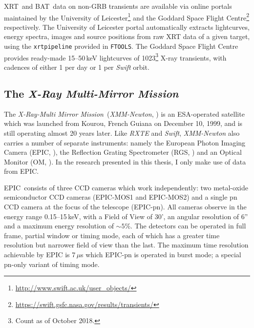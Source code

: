 \par XRT\indexxrt\ and BAT\indexbat\ data on non-GRB transients are available via online portals maintained by the University of Leicester\footnote{\url{http://www.swift.ac.uk/user_objects/}} and the Goddard Space Flight Centre\footnote{\url{https://swift.gsfc.nasa.gov/results/transients/}} respectively.  The University of Leicester portal automatically extracts lightcurves, energy spectra, images and source positions from raw XRT data of a given target, using the \texttt{xrtpipeline} provided in \texttt{FTOOLS}.  The Goddard Space Flight Centre provides ready-made 15--50\,keV lightcurves of 1023\footnote{Count as of October 2018.} X-ray transients, with cadences of either 1 per day or 1 per \textit{Swift} orbit.

\subsection{The \textit{X-Ray Multi-Mirror Mission}}

\par The \textit{X-Ray-Multi Mirror Mission}\indexxmm\ (\textit{XMM-Newton}, \citealp{Jansen_XMM}) is an ESA-operated satellite which was launched from Kourou, French Guiana on December 10, 1999, and is still operating almost 20 years later.  Like \textit{RXTE} and \textit{Swift}, \textit{XMM-Newton} also carries a number of separate instruments: namely the European Photon Imaging Camera (EPIC\indexepic, \citealp{Bignami_EPIC}), the Reflection Grating Spectrometer (RGS\indexrgs, \citealp{denHerder_RGS}) and an Optical Monitor (OM\indexom, \citealp{Mason_OM}).  In the research presented in this thesis, I only make use of data from EPIC.
\par EPIC\indexepic\ consists of three CCD cameras which work independently: two metal-oxide semiconductor CCD cameras (EPIC-MOS1 and EPIC-MOS2) and a single pn CCD camera at the focus of the telescope (EPIC-pn).  All cameras observe in the energy range 0.15--15\,keV, with a Field of View of 30', an angular resolution of 6'' and a maximum energy resolution of $\sim5$\%.  The detectors can be operated in full frame, partial window or timing mode, each of which has a greater time resolution but narrower field of view than the last.  The maximum time resolution achievable by EPIC is 7\,$\mu$s which EPIC-pn is operated in burst mode; a special pn-only variant of timing mode.

